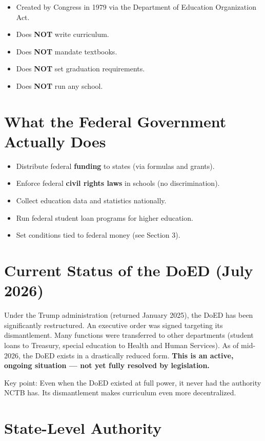 \begin{itemize}
	\item Created by Congress in 1979 via the Department of Education Organization Act.
	\item Does \textbf{NOT} write curriculum.
	\item Does \textbf{NOT} mandate textbooks.
	\item Does \textbf{NOT} set graduation requirements.
	\item Does \textbf{NOT} run any school.
\end{itemize}

\section{What the Federal Government Actually Does}

\begin{itemize}
	\item Distribute federal \textbf{funding} to states (via formulas and grants).
	\item Enforce federal \textbf{civil rights laws} in schools (\eg no discrimination).
	\item Collect education data and statistics nationally.
	\item Run federal student loan programs for higher education.
	\item Set conditions tied to federal money (see Section 3).
\end{itemize}

\section{Current Status of the DoED (July 2026)}

Under the Trump administration (returned January 2025), the DoED has been significantly restructured. An executive order was signed targeting its dismantlement. Many functions were transferred to other departments (\eg student loans to Treasury, special education to Health and Human Services). As of mid-2026, the DoED exists in a drastically reduced form. \textbf{This is an active, ongoing situation --- not yet fully resolved by legislation.}

Key point: Even when the DoED existed at full power, it never had the authority NCTB has. Its dismantlement makes curriculum even more decentralized.

\section{State-Level Authority}

